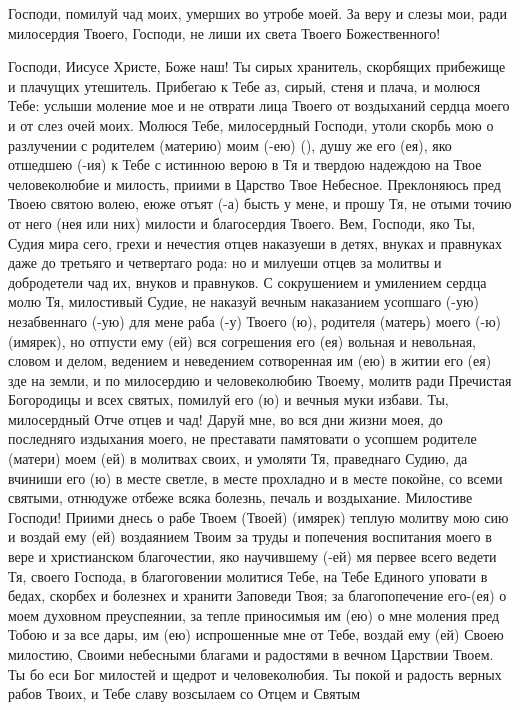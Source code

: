 \mychapterending[1.5]{}


\begin{mymulticols}
 


Господи, помилуй чад моих, умерших во утробе моей. За веру и слезы мои, ради милосердия Твоего, Господи, не лиши их света Твоего Божественного! 

\end{mymulticols}

\mychapterending


\begin{mymulticols}
 


Господи, Иисусе Христе, Боже наш! Ты сирых хранитель, скорбящих прибежище и плачущих утешитель. Прибегаю к Тебе аз, сирый, стеня и плача, и молюся Тебе: услыши моление мое и не отврати лица Твоего от воздыханий сердца моего и от слез очей моих. Молюся Тебе, милосердный Господи, утоли скорбь мою о разлучении с родителем (материю) моим (-ею) (), душу же его (ея), яко отшедшею (-ия) к Тебе с истинною верою в Тя и твердою надеждою на Твое человеколюбие и милость, приими в Царство Твое Небесное. Преклоняюсь пред Твоею святою волею, еюже отъят (-а) бысть у мене, и прошу Тя, не отыми точию от него (нея или них) милости и благосердия Твоего. Вем, Господи, яко Ты, Судия мира сего, грехи и нечестия отцев наказуеши в детях, внуках и правнуках даже до третьяго и четвертаго рода: но и милуеши отцев за молитвы и добродетели чад их, внуков и правнуков. С сокрушением и умилением сердца молю Тя, милостивый Судие, не наказуй вечным наказанием усопшаго (-ую) незабвеннаго (-ую) для мене раба (-у) Твоего (ю), родителя (матерь) моего (-ю) (имярек), но отпусти ему (ей) вся согрешения его (ея) вольная и невольная, словом и делом, ведением и неведением сотворенная им (ею) в житии его (ея) зде на земли, и по милосердию и человеколюбию Твоему, молитв ради Пречистая Богородицы и всех святых, помилуй его (ю) и вечныя муки избави. Ты, милосердный Отче отцев и чад! Даруй мне, во вся дни жизни моея, до последняго издыхания моего, не преставати памятовати о усопшем родителе (матери) моем (ей) в молитвах своих, и умоляти Тя, праведнаго Судию, да вчиниши его (ю) в месте светле, в месте прохладно и в месте покойне, со всеми святыми, отнюдуже отбеже всяка болезнь, печаль и воздыхание. Милостиве Господи! Приими днесь о рабе Твоем (Твоей) (имярек) теплую молитву мою сию и воздай ему (ей) воздаянием Твоим за труды и попечения воспитания моего в вере и христианском благочестии, яко научившему (-ей) мя первее всего ведети Тя, своего Господа, в благоговении молитися Тебе, на Тебе Единого уповати в бедах, скорбех и болезнех и хранити Заповеди Твоя; за благопопечение его-(ея) о моем духовном преуспеянии, за тепле приносимыя им (ею) о мне моления пред Тобою и за все дары, им (ею) испрошенные мне от Тебе, воздай ему (ей) Своею милостию, Своими небесными благами и радостями в вечном Царствии Твоем. Ты бо еси Бог милостей и щедрот и человеколюбия. Ты покой и радость верных рабов Твоих, и Тебе славу возсылаем со Отцем и Святым 
\end{mymulticols}
